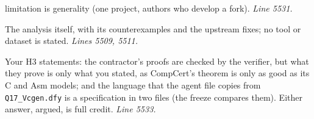 \documentclass[11pt]{article}
\begin{document}
\begin{description}
  limitation is generality (one project, authors who develop a fork).
  \emph{Line 5531.}
\item[Artifact.] The analysis itself, with its counterexamples and the
  upstream fixes; no tool or dataset is stated. \emph{Lines 5509, 5511.}
\item[This module.] Your H3 statements: the contractor's proofs are checked by
  the verifier, but what they prove is only what you stated, as CompCert's
  theorem is only as good as its C and Asm models; and the language that the
  agent file copies from \texttt{Q17\_Vcgen.dfy} is a specification in two
  files (the freeze compares them). Either answer, argued, is full credit.
  \emph{Line 5533.}
\end{description}
\end{document}
